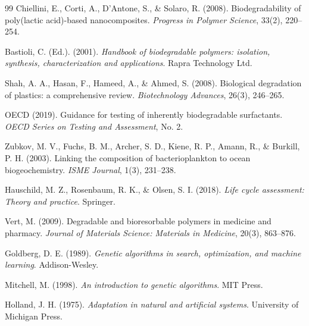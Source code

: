 \documentclass[11pt,letterpaper]{article}
\begin{document}
\begin{thebibliography}{99}
Chiellini, E., Corti, A., D'Antone, S., \& Solaro, R. (2008). Biodegradability of poly(lactic acid)-based nanocomposites. \textit{Progress in Polymer Science}, 33(2), 220--254.

Bastioli, C. (Ed.). (2001). \textit{Handbook of biodegradable polymers: isolation, synthesis, characterization and applications}. Rapra Technology Ltd.

Shah, A. A., Hasan, F., Hameed, A., \& Ahmed, S. (2008). Biological degradation of plastics: a comprehensive review. \textit{Biotechnology Advances}, 26(3), 246--265.

OECD (2019). Guidance for testing of inherently biodegradable surfactants. \textit{OECD Series on Testing and Assessment}, No. 2.

Zubkov, M. V., Fuchs, B. M., Archer, S. D., Kiene, R. P., Amann, R., \& Burkill, P. H. (2003). Linking the composition of bacterioplankton to ocean biogeochemistry. \textit{ISME Journal}, 1(3), 231--238.

Hauschild, M. Z., Rosenbaum, R. K., \& Olsen, S. I. (2018). \textit{Life cycle assessment: Theory and practice}. Springer.

Vert, M. (2009). Degradable and bioresorbable polymers in medicine and pharmacy. \textit{Journal of Materials Science: Materials in Medicine}, 20(3), 863--876.

Goldberg, D. E. (1989). \textit{Genetic algorithms in search, optimization, and machine learning}. Addison-Wesley.

Mitchell, M. (1998). \textit{An introduction to genetic algorithms}. MIT Press.

Holland, J. H. (1975). \textit{Adaptation in natural and artificial systems}. University of Michigan Press.

\end{thebibliography}
\end{document}
